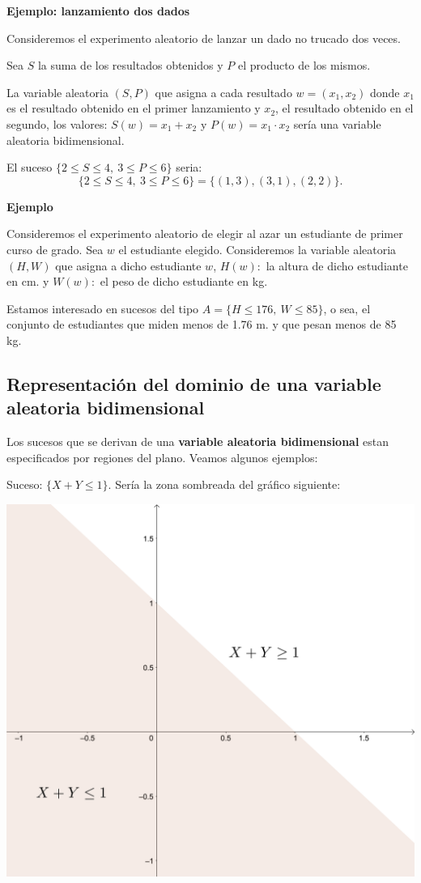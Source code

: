 \documentclass[]{book}
\begin{document}
\textbf{Ejemplo: lanzamiento dos dados}

Consideremos el experimento aleatorio de lanzar un dado no trucado dos veces.

Sea \(S\) la suma de los resultados obtenidos y \(P\) el producto de los mismos.

La variable aleatoria \((S,P)\) que asigna a cada resultado \(w=(x_1,x_2)\) donde \(x_1\) es el resultado obtenido en el primer lanzamiento y \(x_2\), el resultado obtenido en el segundo, los valores: \(S(w)=x_1+x_2\) y \(P(w)=x_1\cdot x_2\) sería una variable aleatoria bidimensional.

El suceso \(\{2\leq S\leq 4,\ 3\leq P\leq 6\}\) seria:
\[
\{2\leq S\leq 4,\ 3\leq P\leq 6\} = \{(1,3),(3,1),(2,2)\}.
\]

\textbf{Ejemplo}

Consideremos el experimento aleatorio de elegir al azar un estudiante de primer curso de grado. Sea \(w\) el estudiante elegido. Consideremos la variable aleatoria \((H,W)\) que asigna a dicho estudiante \(w\), \(H(w):\) la altura de dicho estudiante en cm. y \(W(w):\) el peso de dicho estudiante en kg.

Estamos interesado en sucesos del tipo \(A=\{H\leq 176,\ W\leq 85\}\), o sea, el conjunto de estudiantes que miden menos de 1.76 m. y que pesan menos de 85 kg.

\hypertarget{representaciuxf3n-del-dominio-de-una-variable-aleatoria-bidimensional}{%
\subsection{Representación del dominio de una variable aleatoria bidimensional}\label{representaciuxf3n-del-dominio-de-una-variable-aleatoria-bidimensional}}

Los sucesos que se derivan de una \textbf{variable aleatoria bidimensional} estan especificados por regiones del plano.
Veamos algunos ejemplos:

Suceso: \(\{X+Y\leq 1\}\). Sería la zona sombreada del gráfico siguiente:

\includegraphics{Images/Bidim1.png}
\end{document}

